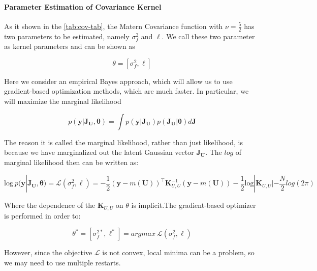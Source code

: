 \documentclass[]{elsarticle} %
\begin{document}
\hypertarget{parameter-estimation-of-covariance-kernel}{%
\paragraph{Parameter Estimation of Covariance Kernel}\label{parameter-estimation-of-covariance-kernel}}

As it shown in the \ref{tab:cov-tab}, the Matern Covariance function with \(\nu=\frac{5}{2}\) has two parameters to be estimated, namely \(\sigma^2_f\) and \(\ell\). We call these two parameter as kernel parameters and can be shown as

\begin{equation}
\theta=[\sigma_{f}^{2}, \ell]
\end{equation}

Here we consider an empirical Bayes approach, which will allow us to use gradient-based optimization methods, which are much faster. In particular, we will maximize the marginal likelihood

\begin{equation}
p(\mathbf{y}|\mathbf{J_U,\mathbf{\theta}})= \int p(\mathbf{y}|\mathbf{J_U})p(\mathbf{J_U}|\mathbf{\theta})d\mathbf{J}
\label{eq:marg_like_int}
\end{equation}

The reason it is called the marginal likelihood, rather than just likelihood, is because we have marginalized out the latent Gaussian vector \(\mathbf{J_U}\). The \(log\) of marginal likelihood then can be written as:

\begin{equation}
\text{log} \: p(\mathbf{y}|\mathbf{J_U,\mathbf{\theta}})=\mathcal{L}(\sigma_f^2,\ell)=-\frac{1}{2}(\mathbf{y}-m(\mathbf{U}))^{\intercal}\mathbf{K}_{U,U}^{-1}(\mathbf{y}-m(\mathbf{U}))-\frac{1}{2}\text{log}|\mathbf{K}_{U,U}|-\frac{N}{2}log(2\pi)
\label{eq:log_like}
\end{equation}

Where the dependence of the \(\mathbf{K}_{U,U}\) on \(\theta\) is implicit.The gradient-based optimizer is performed in order to:

\begin{equation}
\theta^{\ast}=[\sigma_f^{2\ast}, \ell^{\ast}]=argmax \: \mathcal{L}(\sigma^2_f,\ell)
\label{eq:log_like_opt}
\end{equation}

However, since the objective \(\mathcal{L}\) is not convex, local minima can be a problem, so we may need to use multiple restarts.
\end{document}

